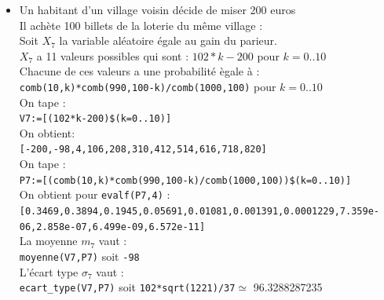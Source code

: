 \documentclass[a4paper,11pt]{book}
\begin{document}
\begin{enumerate}
\begin{itemize}
Si il ach\`ete 10 billets de la loterie de 10 villages diff\'erents :\\
Chaque billet \`a une probabilit\'e de 1/100 d\^etre gagnant car les 10 tirages
sont ind\'ependants : il s'agit alors de la loi binomiale $B(10,1/100)$.
Soit $X_6$ la variable al\'eatoire \'egale au gain du parieur.\\
$X_6$ a 11 valeurs possibles : les m\^emes que $X_5$ et donc :\\
{\tt V6:=V5}\\
Chacune de ces valeurs a une probabilit\'e \`egale \`a  :\\
{\tt binomial(10,k,1/100)=comb(10,k)*(1/100)\verb|^|k*(99/100)\verb|^|(10-k)}
On tape pour vair la probabilit\'e des 11 premi\`eres valeurs :\\
{\tt P6:=[binomial(10,k,1/100)\$(k=0..10)]}\\
On obtient pour {\tt evalf(P5,4)} :\\
{\tt [0.9044,0.09135,0.004152,0.0001118,1.977e-06,2.396e-08, 2.017e-10,1.164e-12,4.41e-15,9.9e-18,1e-20]}
La moyenne $m_6$ vaut :\\
{\tt moyenne(V6,P6)} soit {\tt -49/5}\\
L'\'ecart type $\sigma_6$ vaut :\\
{\tt ecart\_type(V6,P6)} soit {\tt 765*sqrt(110)/250}$\simeq$ 32.093550754\\
\item Un habitant d'un village voisin d\'ecide de miser 200  euros\\
Il ach\`ete 100 billets de la loterie du m\^eme village :\\
Soit $X_7$ la variable al\'eatoire \'egale au gain du parieur.\\
$X_7$ a 11 valeurs possibles qui sont : $102*k-200$ pour $k=0..10$\\
Chacune de ces valeurs a une probabilit\'e \`egale \`a :\\
{\tt comb(10,k)*comb(990,100-k)/comb(1000,100)} pour $k=0..10$\\
On tape :\\
{\tt V7:=[(102*k-200)\$(k=0..10)]}\\
On obtient:\\
{\tt [-200,-98,4,106,208,310,412,514,616,718,820]}\\
On tape :\\
{\tt P7:=[(comb(10,k)*comb(990,100-k)/comb(1000,100))\$(k=0..10)]}\\
On obtient  pour {\tt evalf(P7,4)} :\\
{\tt [0.3469,0.3894,0.1945,0.05691,0.01081,0.001391,0.0001229,7.359e-06,2.858e-07,6.499e-09,6.572e-11]}\\
La moyenne $m_7$ vaut :\\
{\tt moyenne(V7,P7)} soit {\tt -98}\\
L'\'ecart type $\sigma_7$ vaut :\\
{\tt ecart\_type(V7,P7)} soit {\tt 102*sqrt(1221)/37}$\simeq$ 96.3288287235


\end{itemize}
\end{enumerate}
\end{document}
